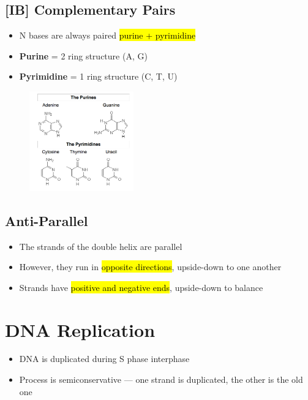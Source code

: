 \documentclass[a4paper,12pt]{article}
\begin{document}
\subsection{[IB] Complementary Pairs}
\begin{itemize}
    \item{N bases are always paired \hl{purine + pyrimidine}}
    \item{\textbf{Purine} = 2 ring structure (A, G)}
    \item{\textbf{Pyrimidine} = 1 ring structure (C, T, U)}
\end{itemize}

\begin{figure}[H]
    \centering
    \includegraphics[width=0.40\textwidth]{ring}
\end{figure}

\subsection{Anti-Parallel}
\begin{itemize}
    \item{The strands of the double helix are parallel}
    \item{However, they run in \hl{opposite directions}, upside-down to one another}
    \item{Strands have \hl{positive and negative ends}, upside-down to balance}
\end{itemize}

\section{DNA Replication}
\begin{itemize}
    \item{DNA is duplicated during S phase interphase}
    \item{Process is semiconservative --- one strand is duplicated, the other is the old one}
\end{itemize}
\end{document}
